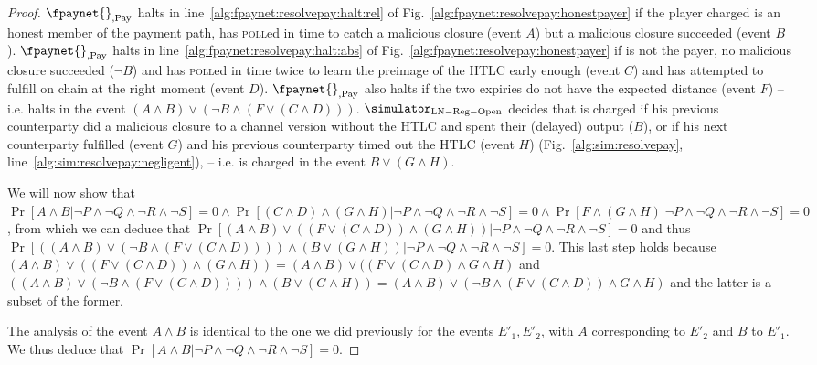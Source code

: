 \begin{proof}
  $\fpaynet{}_{\mathrm{, Pay}}$ halts in
  line~\ref{alg:fpaynet:resolvepay:halt:rel} of
  Fig.~\ref{alg:fpaynet:resolvepay:honestpayer} if the player \dave{} charged is
  an honest member of the payment path, has \textsc{poll}ed in time to catch a
  malicious closure (event $A$) but a malicious closure succeeded (event $B$).
  $\fpaynet{}_{\mathrm{, Pay}}$ halts in
  line~\ref{alg:fpaynet:resolvepay:halt:abs} of
  Fig.~\ref{alg:fpaynet:resolvepay:honestpayer} if \dave{} is not the payer, no
  malicious closure succeeded ($\neg B$) and \dave{} has \textsc{poll}ed in time
  twice to learn the preimage of the HTLC early enough (event $C$) and has
  attempted to fulfill on chain at the right moment (event $D$).
  $\fpaynet{}_{\mathrm{, Pay}}$ also halts if the two expiries do not have the
  expected distance (event $F$) -- i.e. halts in the event $(A \wedge B) \vee
  (\neg B \wedge (F \vee (C \wedge D)))$. $\simulator_{\mathrm{LN - Reg -
  Open}}$ decides that \dave{} is charged if his previous counterparty did a
  malicious closure to a channel version without the HTLC and spent their
  (delayed) output ($B$), or if his next counterparty fulfilled (event $G$) and
  his previous counterparty timed out the HTLC (event $H$)
  (Fig.~\ref{alg:sim:resolvepay}, line~\ref{alg:sim:resolvepay:negligent}), --
  i.e. \dave{} is charged in the event $B \vee (G \wedge H)$.

  We will now show that $\Pr[A \wedge B | \neg P \wedge \neg Q \wedge \neg R
  \wedge \neg S] = 0 \wedge \Pr[(C \wedge D) \wedge (G \wedge H) | \neg P \wedge
  \neg Q \wedge \neg R \wedge \neg S] = 0 \wedge \Pr[F \wedge (G \wedge H) |
  \neg P \wedge \neg Q \wedge \neg R \wedge \neg S] = 0$, from which we can
  deduce that $\Pr[(A \wedge B) \vee ((F \vee (C \wedge D)) \wedge (G \wedge H))
  | \neg P \wedge \neg Q \wedge \neg R \wedge \neg S] = 0$ and thus $\Pr[((A
  \wedge B) \vee (\neg B \wedge (F \vee (C \wedge D)))) \wedge (B \vee (G \wedge
  H)) | \neg P \wedge \neg Q \wedge \neg R \wedge \neg S] = 0$. This last step
  holds because $(A \wedge B) \vee ((F \vee (C \wedge D)) \wedge (G \wedge H)) =
  (A \wedge B) \vee ((F \vee (C \wedge D) \wedge G \wedge H)$ and $((A \wedge B)
  \vee (\neg B \wedge (F \vee (C \wedge D)))) \wedge (B \vee (G \wedge H)) = (A
  \wedge B) \vee (\neg B \wedge (F \vee (C \wedge D)) \wedge G \wedge H)$ and
  the latter is a subset of the former.

  The analysis of the event $A \wedge B$ is identical to the one we did
  previously for the events $E'_1, E'_2$, with $A$ corresponding to $E'_2$ and
  $B$ to $E'_1$. We thus deduce that $\Pr[A \wedge B | \neg P \wedge \neg Q
  \wedge \neg R \wedge \neg S] = 0$.


\end{proof}
